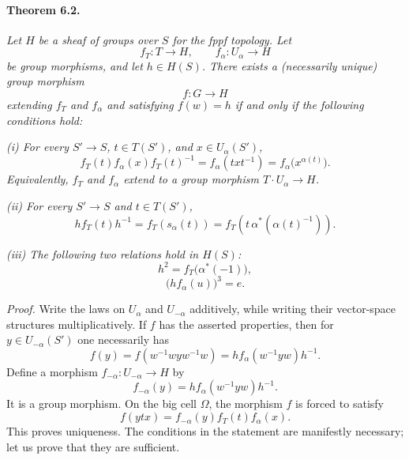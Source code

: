 \paragraph{\textbf{Theorem 6.2.}}
\emph{Let \(H\) be a sheaf of groups over \(S\) for the fppf
topology.  Let}
\[
 f_T\colon T\longrightarrow H,
 \qquad
 f_\alpha\colon U_\alpha\longrightarrow H
\]
\emph{be group morphisms, and let \(h\in H(S)\).  There exists a
\textup{(necessarily unique)} group morphism}
\[
 f\colon G\longrightarrow H
\]
\emph{extending \(f_T\) and \(f_\alpha\) and satisfying \(f(w)=h\)
if and only if the following conditions hold:}

\emph{\textup{(i)} For every \(S'\to S\),
\(t\in T(S')\), and \(x\in U_\alpha(S')\),}
\begin{equation}
\tag{1}\label{sga3:xx:theorem:6-2:equation:1}
 f_T(t)f_\alpha(x)f_T(t)^{-1}
 =f_\alpha(txt^{-1})
 =f_\alpha\bigl(x^{\alpha(t)}\bigr).
\end{equation}
\emph{Equivalently, \(f_T\) and \(f_\alpha\) extend to a group
morphism \(T\cdot U_\alpha\to H\).}

\emph{\textup{(ii)} For every \(S'\to S\) and \(t\in T(S')\),}
\begin{equation}
\tag{2}\label{sga3:xx:theorem:6-2:equation:2}
 h f_T(t)h^{-1}
 =f_T(s_\alpha(t))
 =f_T\!\left(t\,\alpha^\ast(\alpha(t)^{-1})\right).
\end{equation}

\emph{\textup{(iii)} The following two relations hold in \(H(S)\):}
\begin{equation}
\tag{3}\label{sga3:xx:theorem:6-2:equation:3}
 h^2=f_T\bigl(\alpha^\ast(-1)\bigr),
\end{equation}
\begin{equation}
\tag{4}\label{sga3:xx:theorem:6-2:equation:4}
 \bigl(hf_\alpha(u)\bigr)^3=e.
\end{equation}

\smallskip
\noindent\emph{Proof.}
Write the laws on \(U_\alpha\) and \(U_{-\alpha}\) additively, while
writing their vector-space structures multiplicatively.  If \(f\)
has the asserted properties, then for
\(y\in U_{-\alpha}(S')\) one necessarily has
\[
 f(y)
 =f(w^{-1}wyw^{-1}w)
 =h f_\alpha(w^{-1}yw)h^{-1}.
\]
Define a morphism \(f_{-\alpha}\colon U_{-\alpha}\to H\) by
\begin{equation}
\tag{\(\ast_1\)}\label{sga3:xx:theorem:6-2:equation:ast-1}
 f_{-\alpha}(y)=h f_\alpha(w^{-1}yw)h^{-1}.
\end{equation}
It is a group morphism.  On the big cell \(\Omega\), the morphism
\(f\) is forced to satisfy
\[
 f(ytx)=f_{-\alpha}(y)f_T(t)f_\alpha(x).
\]
This proves uniqueness.  The conditions in the statement are
manifestly necessary; let us prove that they are sufficient.

